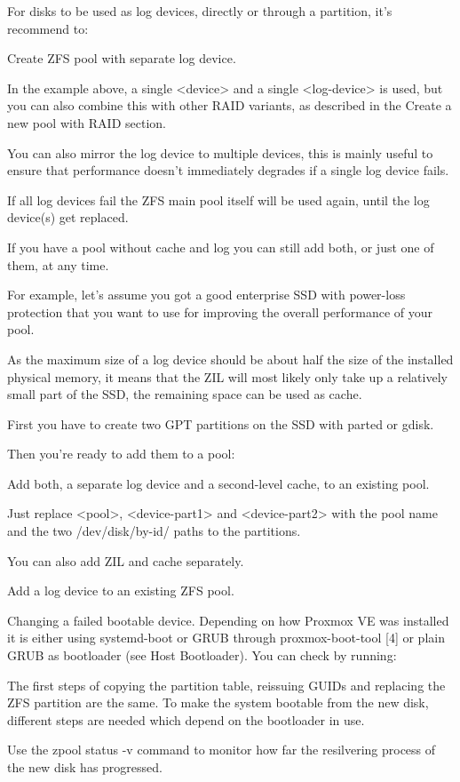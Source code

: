 For disks to be used as log devices, directly or through a partition, it’s recommend to:

Create ZFS pool with separate log device.

In the example above, a single <device> and a single <log-device> is used, but you can also combine this with other RAID variants, as described in the Create a new pool with RAID section.

You can also mirror the log device to multiple devices, this is mainly useful to ensure that performance doesn’t immediately degrades if a single log device fails.

If all log devices fail the ZFS main pool itself will be used again, until the log device(s) get replaced.

If you have a pool without cache and log you can still add both, or just one of them, at any time.

For example, let’s assume you got a good enterprise SSD with power-loss protection that you want to use for improving the overall performance of your pool.

As the maximum size of a log device should be about half the size of the installed physical memory, it means that the ZIL will most likely only take up a relatively small part of the SSD, the remaining space can be used as cache.

First you have to create two GPT partitions on the SSD with parted or gdisk.

Then you’re ready to add them to a pool:

Add both, a separate log device and a second-level cache, to an existing pool.

Just replace <pool>, <device-part1> and <device-part2> with the pool name and the two /dev/disk/by-id/ paths to the partitions.

You can also add ZIL and cache separately.

Add a log device to an existing ZFS pool.

Changing a failed bootable device. Depending on how Proxmox VE was installed it is either using systemd-boot or GRUB through proxmox-boot-tool [4] or plain GRUB as bootloader (see Host Bootloader). You can check by running:

The first steps of copying the partition table, reissuing GUIDs and replacing the ZFS partition are the same. To make the system bootable from the new disk, different steps are needed which depend on the bootloader in use.

Use the zpool status -v command to monitor how far the resilvering process of the new disk has progressed.

